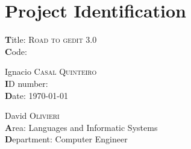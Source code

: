 
\chapter{Project Identification}

{\textbf Title:} \textsc{Road to gedit 3.0}\\
{\textbf Code:} %

 Ignacio \textsc{Casal Quinteiro}\\
{\textbf ID number:} \\ %
{\textbf Date:} \today

 David \textsc{Olivieri}\\
{\textbf Area:} Languages and Informatic Systems\\
{\textbf Department:} Computer Engineer
